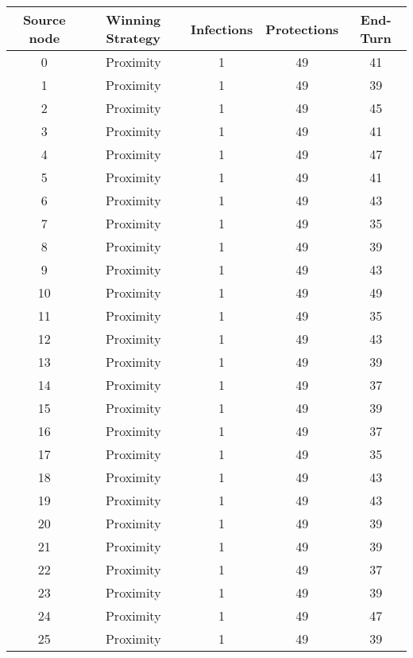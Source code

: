 \documentclass[results.tex]{subfiles}
\begin{document}
\begin{center}
  \begin{tabular}{| c || c | c | c | c |}
    \hline
    {\bfseries Source node} & {\bfseries Winning Strategy} & {\bfseries Infections} & {\bfseries Protections} & {\bfseries End-Turn} \\  %
    \hline\hline
    0 & Proximity & 1 & 49 & 41 \\ 
    \hline
    1 & Proximity & 1 & 49 & 39 \\ 
    \hline
    2 & Proximity & 1 & 49 & 45 \\ 
    \hline
    3 & Proximity & 1 & 49 & 41 \\ 
    \hline
    4 & Proximity & 1 & 49 & 47 \\ 
    \hline
    5 & Proximity & 1 & 49 & 41 \\ 
    \hline
    6 & Proximity & 1 & 49 & 43 \\ 
    \hline
    7 & Proximity & 1 & 49 & 35 \\ 
    \hline
    8 & Proximity & 1 & 49 & 39 \\ 
    \hline
    9 & Proximity & 1 & 49 & 43 \\ 
    \hline
    10 & Proximity & 1 & 49 & 49 \\ 
    \hline
    11 & Proximity & 1 & 49 & 35 \\ 
    \hline
    12 & Proximity & 1 & 49 & 43 \\ 
    \hline
    13 & Proximity & 1 & 49 & 39 \\ 
    \hline
    14 & Proximity & 1 & 49 & 37 \\ 
    \hline
    15 & Proximity & 1 & 49 & 39 \\ 
    \hline
    16 & Proximity & 1 & 49 & 37 \\ 
    \hline
    17 & Proximity & 1 & 49 & 35 \\ 
    \hline
    18 & Proximity & 1 & 49 & 43 \\ 
    \hline
    19 & Proximity & 1 & 49 & 43 \\ 
    \hline
    20 & Proximity & 1 & 49 & 39 \\ 
    \hline
    21 & Proximity & 1 & 49 & 39 \\ 
    \hline
    22 & Proximity & 1 & 49 & 37 \\ 
    \hline
    23 & Proximity & 1 & 49 & 39 \\ 
    \hline
    24 & Proximity & 1 & 49 & 47 \\ 
    \hline
    25 & Proximity & 1 & 49 & 39 \\ 

\end{tabular}
\end{center}
\end{document}
